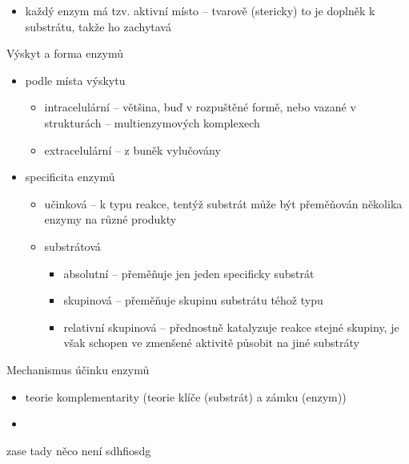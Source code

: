 \documentclass{article}
\begin{document}
\begin{itemize}
  \item každý enzym má tzv. aktivní místo -- tvarově (stericky) to je doplněk k substrátu, takže ho zachytavá
\end{itemize}
Výskyt a forma enzymů
\begin{itemize}
  \item podle místa výskytu
  \begin{itemize}
    \item intracelulární -- většina, buď v rozpuštěné formě, nebo vazané v strukturách -- multienzymových komplexech
    \item extracelulární -- z buněk vylučovány
  \end{itemize}
  \item specificita enzymů
  \begin{itemize}
    \item učinková -- k typu reakce, tentýž substrát může být přeměňován několika enzymy na různé produkty
    \item substrátová
    \begin{itemize}
      \item absolutní -- přeměňuje jen jeden specificky substrát
      \item skupinová -- přeměňuje skupinu substrátu téhož typu
      \item relativní skupinová -- přednostně katalyzuje reakce stejné skupiny, je však schopen ve zmenšené aktivitě působit na jiné substráty
    \end{itemize}
  \end{itemize}
\end{itemize}
Mechanismus účinku enzymů
\begin{itemize}
  \item teorie komplementarity (teorie klíče (substrát) a zámku (enzym))
  \item
\end{itemize}

zase tady něco není sdhfiosdg
\end{document}
